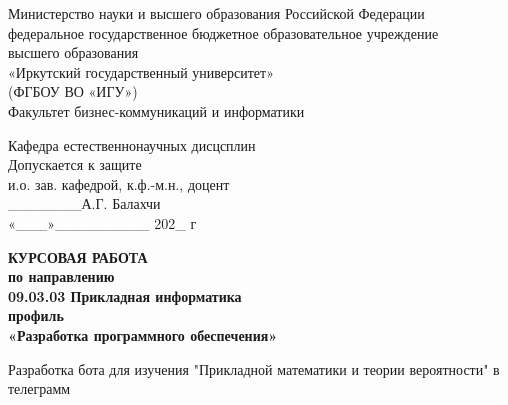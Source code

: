 \documentclass[12pt, oldlfont, amsfonts]{report}
\begin{document}
    \newpage
    \begin{center}
    \linespread{1}
		Министерство науки и высшего образования  Российской Федерации\\
федеральное государственное бюджетное образовательное учреждение\\
высшего образования\\
«Иркутский государственный университет»\\
(ФГБОУ ВО «ИГУ»)\\
Факультет бизнес-коммуникаций и информатики 
    \end{center}
\vspace{1cm}    
\hspace{8cm} 
\begin{minipage}{0.5\textwidth}
\linespread{1}
  \begin{flushleft}
	\small{
    Кафедра естественнонаучных дисцсплин \\%
Допускается к защите \\
и.о. зав. кафедрой, к.ф.-м.н., доцент \\
\_\_\_\_\_\_\_А.Г. Балахчи\\
		«\_\_\_»\_\_\_\_\_\_\_\_\_ 202\_ г \\		}
		
		
		\end{flushleft}
\end{minipage}


    \vspace{2cm}
    \begin{center}
   {\bf КУРСОВАЯ РАБОТА\\
    по направлению  \\
		09.03.03 Прикладная информатика\\
		профиль\\
		«Разработка программного обеспечения»\\}
    \end{center}
		
    \begin{center}
  		Разработка бота для изучения "Прикладной математики и теории вероятности" в телеграмм \\
    \end{center}
		
		\vspace{0.5em}
		
\end{document}
